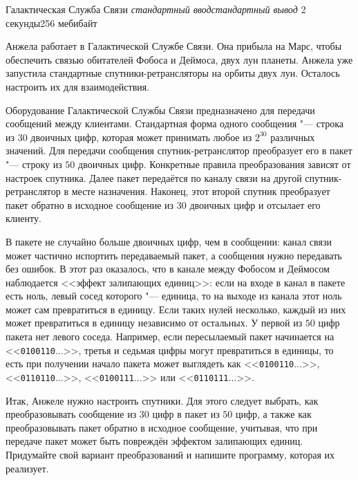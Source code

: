 \gdef\thisproblemorigin{180429, XI Кубок СПбГУ для школьников}
\gdef\thisproblemauthor{Иван Казменко}
\gdef\thisproblemdeveloper{Иван Казменко}
\gdef\messagelen{30}
\gdef\codelen{50}
\begin{problem}{Галактическая Служба Связи}
{\textsl{стандартный ввод}}{\textsl{стандартный вывод}}
{2 секунды}{256 мебибайт}{}

Анжела работает в Галактической Службе Связи.
Она прибыла на Марс, чтобы обеспечить связью обитателей
Фобоса и Деймоса, двух лун планеты.
Анжела уже запустила стандартные спутники-ретрансляторы на орбиты двух лун.
Осталось настроить их для взаимодействия.

Оборудование Галактической Службы Связи предназначено
для передачи сообщений между клиентами.
Стандартная форма одного сообщения "--- строка из $\messagelen$ двоичных цифр,
которая может принимать любое из $2^{\messagelen}$ различных значений.
Для передачи сообщения спутник-ретранслятор преобразует его в пакет "---
строку из $\codelen$ двоичных цифр.
Конкретные правила преобразования зависят от настроек спутника.
Далее пакет передаётся по каналу связи
на другой спутник-ретранслятор в месте назначения.
Наконец, этот второй спутник преобразует пакет обратно
в исходное сообщение из $\messagelen$ двоичных цифр и отсылает его клиенту.

В пакете не случайно больше двоичных цифр, чем в сообщении:
канал связи может частично испортить передаваемый пакет,
а сообщения нужно передавать без ошибок.
В этот раз оказалось, что в канале между Фобосом и Деймосом
наблюдается <<эффект залипающих единиц>>:
если на входе в канал в пакете есть ноль, левый сосед которого "--- единица,
то на выходе из канала этот ноль может сам превратиться в единицу.
Если таких нулей несколько, каждый из них может превратиться в единицу
независимо от остальных.
У первой из $\codelen$ цифр пакета нет левого соседа.
Например, если пересылаемый пакет начинается на <<\texttt{0100110}...>>,
третья и седьмая цифры могут превратиться в единицы, то есть при получении
начало пакета может выглядеть как <<\texttt{0100110}...>>,
<<\texttt{0110110}...>>, <<\texttt{0100111}...>> или <<\texttt{0110111}...>>.

Итак, Анжеле нужно настроить спутники.
Для этого следует выбрать, как преобразовывать сообщение из $\messagelen$ цифр
в пакет из $\codelen$ цифр, а также как преобразовывать пакет
обратно в исходное сообщение, учитывая, что при передаче пакет
может быть повреждён эффектом залипающих единиц.
Придумайте свой вариант преобразований
и напишите программу, которая их реализует.


\end{problem}
